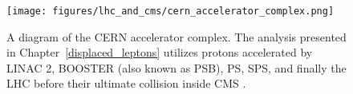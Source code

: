 \begin{figure}
\centering
\texttt{[image: figures/lhc\_and\_cms/cern\_accelerator\_complex.png]}
\caption{A diagram of the CERN accelerator complex. The analysis presented in Chapter~\ref{displaced_leptons} utilizes protons accelerated by LINAC 2, BOOSTER (also known as PSB), PS, SPS, and finally the LHC before their ultimate collision inside CMS \cite{cern_accelerator_complex}.}
\label{cern_accelerator_complex}
\end{figure}